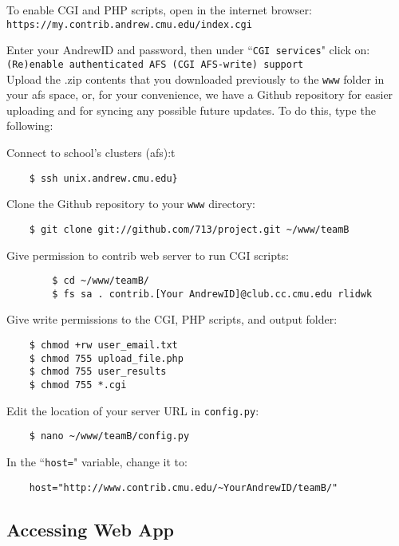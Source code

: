 \documentclass[11pt]{article}
\begin{document}
To enable CGI and PHP scripts, open in the internet browser:\\
\texttt{https://my.contrib.andrew.cmu.edu/index.cgi}
\smallskip

Enter your AndrewID and password, then under ``\texttt{CGI services}" click on:\\
\texttt{(Re)enable authenticated AFS (CGI AFS-write) support}\\

Upload the .zip contents that you downloaded previously to the \texttt{www} folder in your afs space, or, for your convenience, we have a Github repository for easier uploading and for syncing any possible future updates. To do this, type the following:
\bigskip

Connect to school's clusters (afs):t
	\begin{verbatim}
	$ ssh unix.andrew.cmu.edu}
	\end{verbatim}
\bigskip

Clone the Github repository to your \texttt{www} directory:
	\begin{verbatim}
	$ git clone git://github.com/713/project.git ~/www/teamB
	\end{verbatim}
\bigskip

Give permission to contrib web server to run CGI scripts:
	\begin{verbatim}
		$ cd ~/www/teamB/
		$ fs sa . contrib.[Your AndrewID]@club.cc.cmu.edu rlidwk
	\end{verbatim}
\bigskip

Give write permissions to the CGI, PHP scripts, and output folder:
	\begin{verbatim}
	$ chmod +rw user_email.txt
	$ chmod 755 upload_file.php
	$ chmod 755 user_results
	$ chmod 755 *.cgi
	\end{verbatim}
\bigskip

Edit the location of your server URL in \texttt{config.py}:
	\begin{verbatim}
	$ nano ~/www/teamB/config.py
	\end{verbatim}
In the ``\texttt{host=}" variable, change it to:
	\begin{verbatim}
	host="http://www.contrib.cmu.edu/~YourAndrewID/teamB/"
	\end{verbatim}
\subsection{Accessing Web App}
\end{document}
